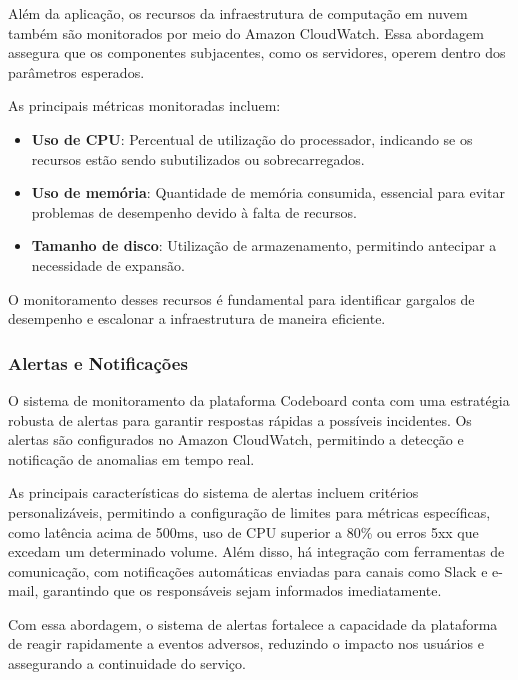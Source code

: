Além da aplicação, os recursos da infraestrutura de computação em nuvem também são monitorados por meio do Amazon CloudWatch. Essa abordagem assegura que os componentes subjacentes, como os servidores, operem dentro dos parâmetros esperados.

As principais métricas monitoradas incluem:

\begin{itemize}
    \item \textbf{Uso de CPU}: Percentual de utilização do processador, indicando se os recursos estão sendo subutilizados ou sobrecarregados.
    \item \textbf{Uso de memória}: Quantidade de memória consumida, essencial para evitar problemas de desempenho devido à falta de recursos.
    \item \textbf{Tamanho de disco}: Utilização de armazenamento, permitindo antecipar a necessidade de expansão.
\end{itemize}

O monitoramento desses recursos é fundamental para identificar gargalos de desempenho e escalonar a infraestrutura de maneira eficiente.

\subsubsection{Alertas e Notificações}

O sistema de monitoramento da plataforma Codeboard conta com uma estratégia robusta de alertas para garantir respostas rápidas a possíveis incidentes. Os alertas são configurados no Amazon CloudWatch, permitindo a detecção e notificação de anomalias em tempo real.

As principais características do sistema de alertas incluem critérios personalizáveis, permitindo a configuração de limites para métricas específicas, como latência acima de 500ms, uso de CPU superior a 80\% ou erros 5xx que excedam um determinado volume. Além disso, há integração com ferramentas de comunicação, com notificações automáticas enviadas para canais como Slack e e-mail, garantindo que os responsáveis sejam informados imediatamente.

Com essa abordagem, o sistema de alertas fortalece a capacidade da plataforma de reagir rapidamente a eventos adversos, reduzindo o impacto nos usuários e assegurando a continuidade do serviço.